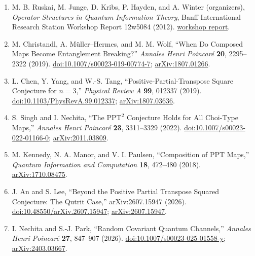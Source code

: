 \begin{enumerate}[label={},leftmargin=4.8em,labelsep=0.5em]
  \footnotesize
  \item[\textup{[BIRS12]}]\label{ref:p32-birs}
  M. B. Ruskai, M. Junge, D. Kribs, P. Hayden, and A. Winter (organizers),
  \emph{Operator Structures in Quantum Information Theory}, Banff
  International Research Station Workshop Report 12w5084 (2012).
  \href{https://www.birs.ca/workshops/2012/12w5084/report12w5084.pdf}{workshop report}.

  \item[\textup{[CMW19]}]\label{ref:p32-christandl}
  M. Christandl, A. M\"uller--Hermes, and M. M. Wolf, ``When Do Composed Maps
  Become Entanglement Breaking?'' \emph{Annales Henri Poincar\'e} \textbf{20},
  2295--2322 (2019).
  \href{https://doi.org/10.1007/s00023-019-00774-7}{doi:10.1007/s00023-019-00774-7};
  \href{https://arxiv.org/abs/1807.01266}{arXiv:1807.01266}.

  \item[\textup{[CYT19]}]\label{ref:p32-chen}
  L. Chen, Y. Yang, and W.-S. Tang, ``Positive-Partial-Transpose Square
  Conjecture for $n=3$,'' \emph{Physical Review A} \textbf{99}, 012337
  (2019). \href{https://doi.org/10.1103/PhysRevA.99.012337}{doi:10.1103/PhysRevA.99.012337};
  \href{https://arxiv.org/abs/1807.03636}{arXiv:1807.03636}.

  \item[\textup{[SN22]}]\label{ref:p32-singh}
  S. Singh and I. Nechita, ``The $\mathrm{PPT}^2$ Conjecture Holds for All
  Choi-Type Maps,'' \emph{Annales Henri Poincar\'e} \textbf{23}, 3311--3329
  (2022). \href{https://doi.org/10.1007/s00023-022-01166-0}{doi:10.1007/s00023-022-01166-0};
  \href{https://arxiv.org/abs/2011.03809}{arXiv:2011.03809}.

  \item[\textup{[KMP18]}]\label{ref:p32-kennedy}
  M. Kennedy, N. A. Manor, and V. I. Paulsen, ``Composition of PPT Maps,''
  \emph{Quantum Information and Computation} \textbf{18}, 472--480 (2018).
  \href{https://arxiv.org/abs/1710.08475}{arXiv:1710.08475}.

  \item[\textup{[AL26]}]\label{ref:p32-an-lee}
  J. An and S. Lee, ``Beyond the Positive Partial Transpose Squared
  Conjecture: The Qutrit Case,'' arXiv:2607.15947 (2026).
  \href{https://doi.org/10.48550/arXiv.2607.15947}{doi:10.48550/arXiv.2607.15947};
  \href{https://arxiv.org/abs/2607.15947}{arXiv:2607.15947}.

  \item[\textup{[NP26]}]\label{ref:p32-nechita-park}
  I. Nechita and S.-J. Park, ``Random Covariant Quantum Channels,'' \emph{Annales
  Henri Poincar\'e} \textbf{27}, 847--907 (2026).
  \href{https://doi.org/10.1007/s00023-025-01558-y}{doi:10.1007/s00023-025-01558-y};
  \href{https://arxiv.org/abs/2403.03667}{arXiv:2403.03667}.


\end{enumerate}
